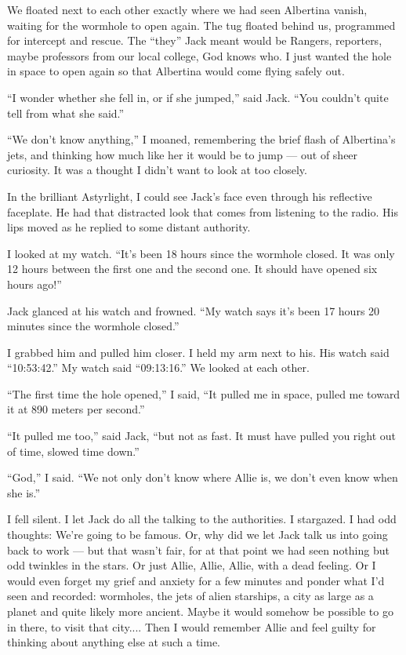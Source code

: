 \documentclass[english,11pt,letterpaper,onecolumn]{scrbook}
\begin{document}
	We floated next to each other exactly where we had seen Albertina vanish, waiting for the wormhole to open again.  The tug floated behind us, programmed for intercept and rescue.  The ``they'' Jack meant would be Rangers, reporters, maybe professors from our local college, God knows who.  I just wanted the hole in space to open again so that Albertina would come flying safely out.

	``I wonder whether she fell in, or if she jumped,'' said Jack.  ``You couldn't quite tell from what she said.''

	``We don't know anything,'' I moaned, remembering the brief flash of Albertina's jets, and thinking how much like her it would be to jump --- out of sheer curiosity.  It was a thought I didn't want to look at too closely.

	In the brilliant Astyrlight, I could see Jack's face even through his reflective faceplate.  He had that distracted look that comes from listening to the radio.  His lips moved as he replied to some distant authority.

	I looked at my watch.  ``It's been 18 hours since the wormhole closed.  It was only 12 hours between the first one and the second one.  It should have opened six hours ago!''

	Jack glanced at his watch and frowned.  ``My watch says it's been 17 hours 20 minutes since the wormhole closed.''

	I grabbed him and pulled him closer.  I held my arm next to his.  His watch said ``10:53:42.''  My watch said ``09:13:16.''  We looked at each other.

	``The first time the hole opened,'' I said, ``It pulled me in space, pulled me toward it at 890 meters per second.''

	``It pulled me too,'' said Jack, ``but not as fast.  It must have pulled you right out of time, slowed time down.''

	``God,'' I said.  ``We not only don't know where Allie is, we don't even know when she is.''

	I fell silent.  I let Jack do all the talking to the authorities.  I stargazed.  I had odd thoughts:  We're going to be famous.  Or, why did we let Jack talk us into going back to work --- but that wasn't fair, for at that point we had seen nothing but odd twinkles in the stars.  Or just Allie, Allie, Allie, with a dead feeling.  Or I would even forget my grief and anxiety for a few minutes and ponder what I'd seen and recorded:  wormholes, the jets of alien starships, a city as large as a planet and quite likely more ancient.  Maybe it would somehow be possible to go in there, to visit that city....  Then I would remember Allie and feel guilty for thinking about anything else at such a time.
\end{document}

